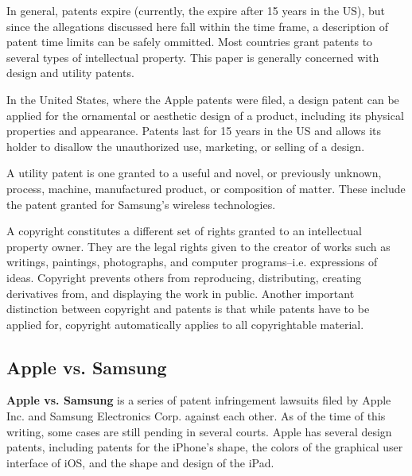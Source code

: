 \documentclass[prodmode,cs196]{acmlarge}
\begin{document}
In general, patents expire (currently, the expire after 15 years in the US), but since the allegations discussed here fall within the time frame, a description of patent time limits can be safely ommitted. Most countries grant patents to several types of intellectual property. This paper is generally concerned with design and utility patents. 

In the United States, where the Apple patents were filed, a design patent can be applied for the ornamental or aesthetic design of a product, including its physical properties and appearance. Patents last for 15 years in the US and allows its holder to disallow the unauthorized use, marketing, or selling of a design. \cite{USPTOPatents}

A utility patent is one granted to a useful and novel, or previously unknown, process, machine, manufactured product, or composition of matter. These include the patent granted for Samsung's wireless technologies. \cite{USPTOPatents}

A copyright constitutes a different set of rights granted to an intellectual property owner. They are the legal rights given to the creator of works such as writings, paintings, photographs, and computer programs--i.e. expressions of ideas. Copyright prevents others from reproducing, distributing, creating derivatives from, and displaying the work in public. Another important distinction between copyright and patents is that while patents have to be applied for, copyright automatically applies to all copyrightable material. \cite{PlagiarismTodayCopyright}

\subsection{Apple vs. Samsung}

\textbf{Apple vs. Samsung} is a series of patent infringement lawsuits filed by Apple Inc. and Samsung Electronics Corp. against each other. As of the time of this writing, some cases are still pending in several courts. Apple has several design patents, including patents for the iPhone's shape, the colors of the graphical user interface of iOS, and the shape and design of the iPad.
\end{document}

